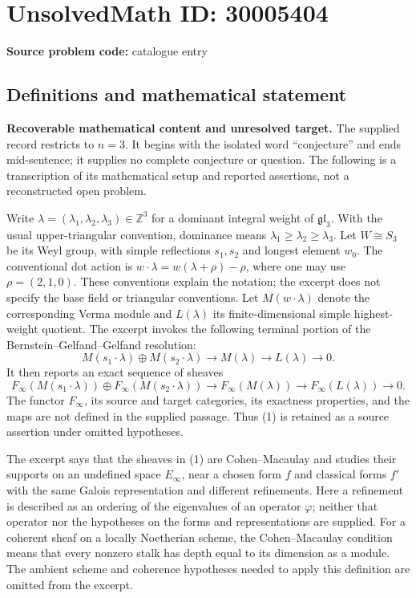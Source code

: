 \documentclass[11pt]{article}
\newcommand{\Z}{\mathbb{Z}}
\begin{document}
\section*{UnsolvedMath ID: 30005404}
\textbf{Source problem code:} catalogue entry
\subsection{Definitions and mathematical statement}
\textbf{Recoverable mathematical content and unresolved target.}
The supplied record restricts to \(n=3\). It begins with the isolated word ``conjecture'' and ends mid-sentence; it supplies no complete conjecture or question. The following is a transcription of its mathematical setup and reported assertions, not a reconstructed open problem.

Write \(\lambda=(\lambda_1,\lambda_2,\lambda_3)\in\Z^3\) for a dominant integral weight of \(\mathfrak{gl}_3\). With the usual upper-triangular convention, dominance means \(\lambda_1\geq\lambda_2\geq\lambda_3\). Let \(W\cong S_3\) be its Weyl group, with simple reflections \(s_1,s_2\) and longest element \(w_0\). The conventional dot action is \(w\cdot\lambda=w(\lambda+\rho)-\rho\), where one may use \(\rho=(2,1,0)\). These conventions explain the notation; the excerpt does not specify the base field or triangular conventions. Let \(M(w\cdot\lambda)\) denote the corresponding Verma module and \(L(\lambda)\) its finite-dimensional simple highest-weight quotient. The excerpt invokes the following terminal portion of the Bernstein--Gelfand--Gelfand resolution:
\[
M(s_1\cdot\lambda)\oplus M(s_2\cdot\lambda)
\longrightarrow M(\lambda)
\longrightarrow L(\lambda)
\longrightarrow 0.
\]
It then reports an exact sequence of sheaves
\[
F_\infty(M(s_1\cdot\lambda))\oplus F_\infty(M(s_2\cdot\lambda))
\longrightarrow F_\infty(M(\lambda))
\longrightarrow F_\infty(L(\lambda))
\longrightarrow 0.
\tag{1}
\]
The functor \(F_\infty\), its source and target categories, its exactness properties, and the maps are not defined in the supplied passage. Thus (1) is retained as a source assertion under omitted hypotheses.

The excerpt says that the sheaves in (1) are Cohen--Macaulay and studies their supports on an undefined space \(E_\infty\), near a chosen form \(f\) and classical forms \(f'\) with the same Galois representation and different refinements. Here a refinement is described as an ordering of the eigenvalues of an operator \(\varphi\); neither that operator nor the hypotheses on the forms and representations are supplied. For a coherent sheaf on a locally Noetherian scheme, the Cohen--Macaulay condition means that every nonzero stalk has depth equal to its dimension as a module. The ambient scheme and coherence hypotheses needed to apply this definition are omitted from the excerpt.
\end{document}
